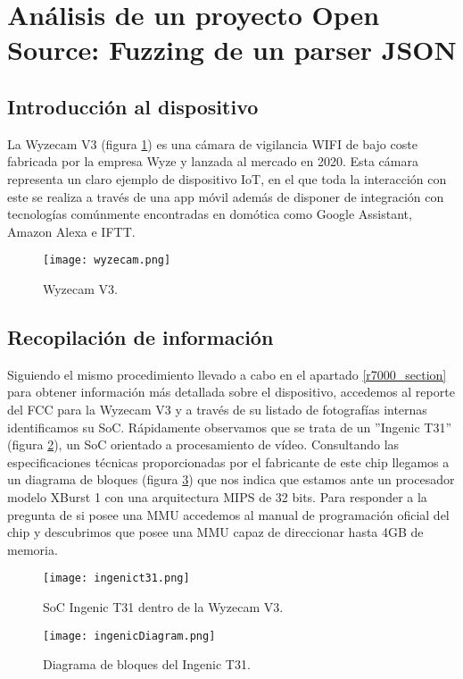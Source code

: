 \section{Análisis de un proyecto Open Source: Fuzzing de un parser JSON}
\subsection{Introducción al dispositivo}
La Wyzecam V3 (figura \ref{fig:wyzecam}) es una cámara de vigilancia WIFI de bajo coste fabricada por la empresa Wyze y lanzada al mercado
en 2020. Esta cámara representa
un claro ejemplo de dispositivo IoT, en el que toda la interacción con este se realiza a través de una app móvil además de disponer de integración con 
tecnologías comúnmente encontradas en domótica como Google Assistant, Amazon Alexa e IFTT.

\begin{figure}[H]
    \centering
    \texttt{[image: wyzecam.png]}
    \caption{Wyzecam V3.}
    \label{fig:wyzecam}
\end{figure}

\subsection{Recopilación de información}
Siguiendo el mismo procedimiento llevado a cabo en el apartado \ref{r7000_section} para obtener información más detallada sobre
el dispositivo, accedemos al reporte del FCC para la Wyzecam V3\cite{wyzecamFCCid} y a través de su listado de fotografías internas
identificamos su SoC. Rápidamente observamos que se trata de un ''Ingenic T31'' (figura \ref{fig:ingenict31}), un SoC orientado a procesamiento 
de vídeo. Consultando las especificaciones técnicas proporcionadas por el fabricante de este chip llegamos a un diagrama de bloques 
(figura \ref{fig:ingenicDiagram}) que nos indica que estamos ante un procesador modelo XBurst 1 con una arquitectura MIPS de 32 bits.
Para responder a la pregunta de si posee una MMU accedemos al manual de programación oficial del chip\cite{xburstmanual} y descubrimos 
que posee una MMU capaz de direccionar hasta 4GB de memoria.

\begin{figure}[H]
    \centering
    \texttt{[image: ingenict31.png]}
    \caption{SoC Ingenic T31 dentro de la Wyzecam V3\cite{wyzecamFCCid}.}
    \label{fig:ingenict31}
\end{figure}

\begin{figure}[H]
    \centering
    \texttt{[image: ingenicDiagram.png]}
    \caption{Diagrama de bloques del Ingenic T31\cite{ingenicproductpage}.}
    \label{fig:ingenicDiagram}
\end{figure}


